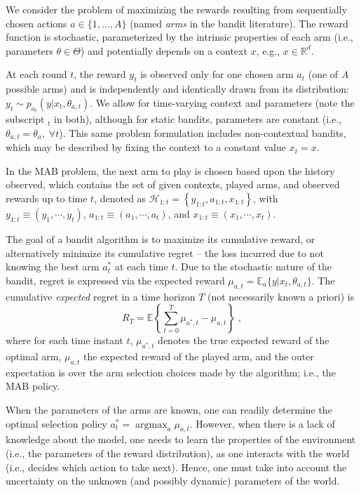 \documentclass{article}
\def \Real{{\mathbb R}}
\newcommand{\eValue}[1]{\mathbb{E}\left\{ #1 \right\}}
\newcommand{\HH}{\mathcal{H}}
\newcommand{\ie}{i.e., }
\newcommand{\eg}{e.g., }
\newcommand{\argmax}{\mathop{\mathrm{argmax}}}
\begin{document}
We consider the problem of maximizing the rewards resulting from sequentially chosen actions $a\in\{1,\ldots,A\}$ (named \textit{arms} in the bandit literature). The reward function is stochastic, parameterized by the intrinsic properties of each arm (\ie parameters $\theta \in \Theta$) and potentially depends on a context $x$, \eg $x\in \Real^{d}$.

At each round $t$, the reward $y_t$ is observed only for one chosen arm $a_t$ (one of $A$ possible arms) and is independently and identically drawn from its distribution: $y_t\sim p_{a_t}(y|x_t,\theta_{a,t})$. We allow for time-varying context and parameters (note the subscript $_t$ in both), although for static bandits, parameters are constant (\ie $\theta_{a,t}=\theta_a, \; \forall t$). This same problem formulation includes non-contextual bandits, which may be described by fixing the context to a constant value $x_t=x$.

In the MAB problem, the next arm to play is chosen based upon the history observed, which contains the set of given contexts, played arms, and observed rewards up to time $t$, denoted as
$\HH_{1:t}=
  \left\{y_{1:t}, a_{1:t}, x_{1:t}\right\}$, 
  with 
  $y_{1:t} \equiv (y_1, \cdots , y_t)$,
  $a_{1:t} \equiv (a_1, \cdots , a_t)$, and 
  $x_{1:t} \equiv (x_1, \cdots , x_t)$. 

The goal of a bandit algorithm is to maximize its cumulative reward, or alternatively minimize its cumulative regret -- the loss incurred due to not knowing the best arm $a_t^*$ at each time $t$. Due to the stochastic nature of the bandit, regret is expressed via the expected reward $\mu_{a,t}=\mathbb{E}_{a}\{y|x_t,\theta_{a,t}\}$. The cumulative \emph{expected} regret in a time horizon $T$ (not necessarily known a priori) is
\begin{equation}
R_T=\eValue{ \sum_{t=0}^T \mu_{a^*,t}-\mu_{a,t} } \; ,
\label{eq:cumulative_regret}
\end{equation}
where for each time instant $t$, $\mu_{a^*,t}$ denotes the true expected reward of the optimal arm, $\mu_{a,t}$ the expected reward of the played arm, and the outer expectation is over the arm selection choices made by the algorithm; \ie the MAB policy.

When the parameters of the arms are known, one can readily determine the optimal selection policy $a_t^*=\argmax_{a}\mu_{a,t}$. However, when there is a lack of knowledge about the model, one needs to learn the properties of the environment (\ie the parameters of the reward distribution), as one interacts with the world (\ie decides which action to take next). Hence, one must take into account the uncertainty on the unknown (and possibly dynamic) parameters of the world.
\end{document}

